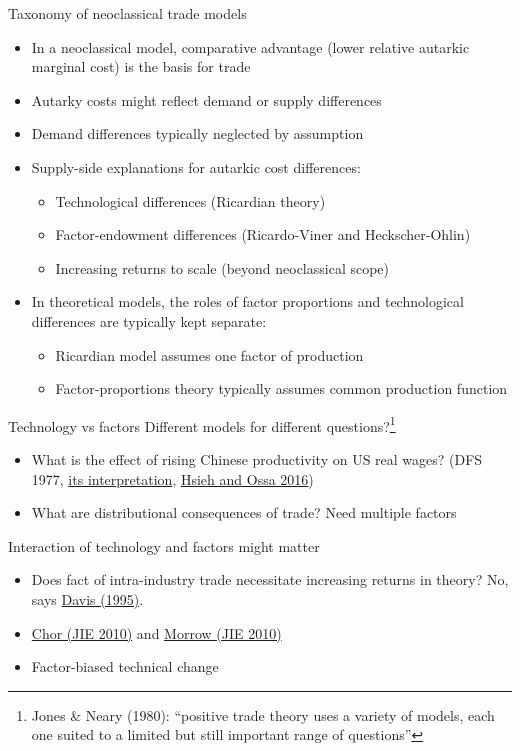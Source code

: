 \documentclass[11pt,notes=hide,aspectratio=169]{beamer}
\begin{document}
\begin{frame}{Taxonomy of neoclassical trade models}
\begin{itemize}
	\item In a neoclassical model, comparative advantage (lower relative autarkic marginal cost) is the basis for trade
	\item Autarky costs might reflect demand or supply differences
	\item Demand differences typically neglected by assumption
	\item Supply-side explanations for autarkic cost differences:
	\begin{itemize}
		\item Technological differences (Ricardian theory)
		\item Factor-endowment differences (Ricardo-Viner and Heckscher-Ohlin)
		\item Increasing returns to scale (beyond neoclassical scope)
	\end{itemize}
	\item In theoretical models,
	the roles of factor proportions and technological differences are typically kept separate:
	\begin{itemize}
		\item Ricardian model assumes one factor of production
		\item Factor-proportions theory typically assumes common production function
	\end{itemize}
\end{itemize}
\end{frame}
\begin{frame}{Technology vs factors}
Different models for different questions?\footnote{\scriptsize Jones \& Neary (1980): ``positive trade theory uses a variety of models, each one suited to a limited but still important range of questions''}
\begin{itemize}
	\item What is the effect of rising Chinese productivity on US real wages? (DFS 1977, \href{https://tradediversion.net/2011/03/29/ricardo-revisited-back-to-2004/}{its interpretation}, \href{https://faculty.chicagobooth.edu/chang-tai.hsieh/research/hsieh_ossa_jie.pdf}{Hsieh and Ossa 2016})
	\item What are distributional consequences of trade? Need multiple factors
\end{itemize}
Interaction of technology and factors might matter
\begin{itemize}
	\item Does fact of intra-industry trade necessitate increasing returns in theory? No, says \href{https://www.sciencedirect.com/science/article/pii/0022199695013833}{Davis (1995)}.
	\item \href{https://ideas.repec.org/a/eee/inecon/v82y2010i2p152-167.html}{Chor (JIE 2010)} and \href{https://ideas.repec.org/a/eee/inecon/v82y2010i2p137-151.html}{Morrow (JIE 2010)} 
	\item Factor-biased technical change
\end{itemize}
\end{frame}
\end{document}
